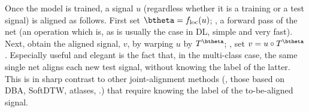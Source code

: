 Once the model is trained, a signal $u$ (regardless whether it is a training or a test signal) is aligned as follows. 
 First set $\btheta=f_{\mathrm{loc}}(u)$; \ie, a forward pass of the net (an operation which is, as is usually the case in DL, simple and very fast). Next, obtain the aligned signal, $v$, by warping $u$ by $T^\btheta$; \ie, set $v=u\circ T^\btheta$. 
 Especially useful and elegant is the fact that, in the multi-class case, the same single net aligns 
 each new test signal, without knowing the label of the latter. This is in sharp contrast
 to other joint-alignment methods (\eg, those based on DBA, SoftDTW, atlases, \etc.)
 that require knowing the label of the to-be-aligned signal. 
